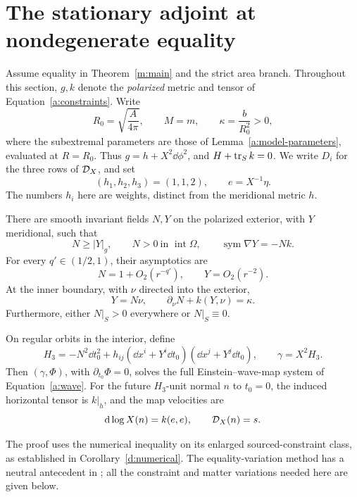 \section{The stationary adjoint at nondegenerate equality}
\label{j:section}

Assume equality in Theorem~\ref{m:main} and the strict area branch. Throughout
this section, \(g,k\) denote the \emph{polarized} metric and tensor of
Equation~\eqref{a:constraints}. Write
\[
 R_0=\sqrt{\frac{A}{4\pi}},\qquad M=m,\qquad
 \kappa=\frac{b}{R_0^2}>0,
\]
where the subextremal parameters are those of
Lemma~\ref{a:model-parameters}, evaluated at \(R=R_0\).
Thus \(g=h+X^2\dd\phi^2\), and \(H+\operatorname{tr}_Sk=0\).
We write \(D_i\) for the three rows of \(\mathcal D_X\), and set
\[
 (h_1,h_2,h_3)=(1,1,2),\qquad e=X^{-1}\eta.
\]
The numbers \(h_i\) here are weights, distinct from the meridional metric \(h\).

\begin{proposition}
\label{j:adjoint}
There are smooth invariant fields \(N,Y\) on the polarized exterior,
with \(Y\) meridional, such that
\begin{equation}
\label{j:causal}
 N\geq |Y|_g,\qquad N>0\ \text{in }\operatorname{int}\Omega,\qquad
 \operatorname{sym}\nabla Y=-Nk.
\end{equation}
For every \(q'\in(1/2,1)\), their asymptotics are
\begin{equation}
\label{j:asymptotic}
 N=1+O_2(r^{-q'}),\qquad Y=O_2(r^{-2}).
\end{equation}
At the inner boundary, with \(\nu\) directed into the exterior,
\begin{equation}
\label{j:boundary}
 Y=N\nu,\qquad \partial_\nu N+k(Y,\nu)=\kappa.
\end{equation}
Furthermore, either \(N|_S>0\) everywhere or \(N|_S\equiv0\).

On regular orbits in the interior, define
\begin{equation}
\label{j:stationary-metric}
 H_3=-N^2\dd t_0^2+
       h_{ij}(\dd x^i+Y^i\dd t_0)(\dd x^j+Y^j\dd t_0),
 \qquad \gamma=X^2H_3.
\end{equation}
Then \((\gamma,\Phi)\), with \(\partial_{t_0}\Phi=0\), solves the full
Einstein--wave-map system of Equation~\eqref{a:wave}. For the future
\(H_3\)-unit normal \(n\) to \(t_0=0\), the induced horizontal tensor is
\(k|_h\), and the map velocities are
\[
 \mathrm d\log X(n)=k(e,e),\qquad \mathcal D_X(n)=s.
\]
\end{proposition}

The proof uses the numerical inequality on its enlarged sourced-constraint
class, as established in Corollary~\ref{d:numerical}. The equality-variation
method has a neutral antecedent in \cite{NeutralExterior2026}; all the
constraint and matter variations needed here are given below.

